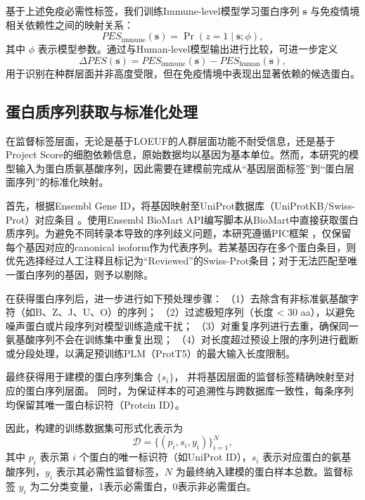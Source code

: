 基于上述免疫必需性标签，我们训练Immune-level模型学习蛋白序列 $\mathbf{s}$ 与免疫情境相关依赖性之间的映射关系：
\begin{equation}
    PES_{\mathrm{immune}}(\mathbf{s})
    =
    \Pr(z=1 \mid \mathbf{s}; \phi),
\end{equation}
其中 $\phi$ 表示模型参数。通过与Human-level模型输出进行比较，可进一步定义
\begin{equation}
    \Delta PES(\mathbf{s})
    =
    PES_{\mathrm{immune}}(\mathbf{s})
    -
    PES_{\mathrm{human}}(\mathbf{s}),
    \label{eq:delta_pes}
\end{equation}
用于识别在种群层面并非高度受限，但在免疫情境中表现出显著依赖的候选蛋白。

\subsection{蛋白质序列获取与标准化处理}

在监督标签层面，无论是基于LOEUF的人群层面功能不耐受信息，还是基于Project Score的细胞依赖信息，原始数据均以基因为基本单位。然而，本研究的模型输入为蛋白质氨基酸序列，因此需要在建模前完成从“基因层面标签”到“蛋白层面序列”的标准化映射。

首先，根据Ensembl Gene ID，将基因映射至UniProt数据库（UniProtKB/Swiss-Prot）对应条目 \cite{consortium2023uniprot}。使用Ensembl BioMart API编写脚本从BioMart中直接获取蛋白质序列。为避免不同转录本导致的序列歧义问题，本研究遵循PIC框架 \cite{kang2024comprehensive}，仅保留每个基因对应的canonical isoform作为代表序列。若某基因存在多个蛋白条目，则优先选择经过人工注释且标记为“Reviewed”的Swiss-Prot条目；对于无法匹配至唯一蛋白序列的基因，则予以剔除。

在获得蛋白序列后，进一步进行如下预处理步骤：  
（1）去除含有非标准氨基酸字符（如B、Z、J、U、O）的序列；  
（2）过滤极短序列（长度 < 30 aa），以避免噪声蛋白或片段序列对模型训练造成干扰；  
（3）对重复序列进行去重，确保同一氨基酸序列不会在训练集中重复出现；  
（4）对长度超过预设上限的序列进行截断或分段处理，以满足预训练PLM（ProtT5）的最大输入长度限制。

最终获得用于建模的蛋白序列集合 $\{s_i\}$，
并将基因层面的监督标签精确映射至对应的蛋白序列层面。
同时，为保证样本的可追溯性与跨数据库一致性，每条序列均保留其唯一蛋白标识符（Protein ID）。

因此，构建的训练数据集可形式化表示为
\begin{equation}
\mathcal{D} = \{(p_i, s_i, y_i)\}_{i=1}^{N},
\end{equation}
其中 $p_i$ 表示第 $i$ 个蛋白的唯一标识符（如UniProt ID），$s_i$ 表示对应蛋白的氨基酸序列，$y_i$ 表示其必需性监督标签，$N$ 为最终纳入建模的蛋白样本总数。监督标签 $y_i$ 为二分类变量，1表示必需蛋白，0表示非必需蛋白。


